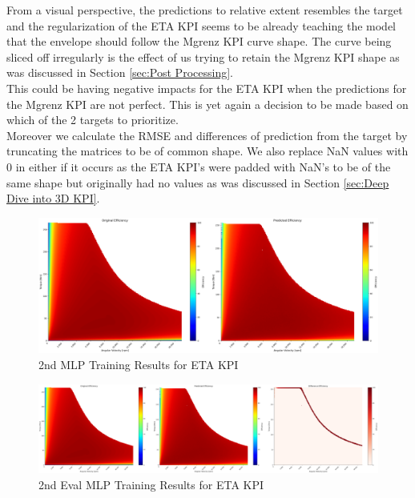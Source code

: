 \documentclass{report} %
\begin{document}
From a visual perspective, the predictions to relative extent resembles the target and the regularization of the ETA \ac{KPI} seems to be already teaching the model that the envelope should follow the Mgrenz \ac{KPI} curve shape.  
The curve being sliced off irregularly is the effect of us trying to retain the Mgrenz \ac{KPI} shape as was discussed in Section \ref{sec:Post Processing}.\\
This could be having negative impacts for the ETA \ac{KPI}  when the predictions for the Mgrenz \ac{KPI} are not perfect.
This is yet again a decision to be made based on which of the 2 targets to prioritize. \\

Moreover we calculate the RMSE and differences of prediction from the target by truncating the matrices to be of common shape.
We also replace \ac{NaN} values with 0 in either if it occurs as the ETA \ac{KPI}'s were padded with \ac{NaN}'s to be of the same shape but originally had no values as was discussed in Section \ref{sec:Deep Dive into 3D KPI}.\\

\begin{figure}[H]
    \centering
    \includegraphics[width=1\textwidth]{./ReportImages/KPI3Dprediction2.png} 
    \caption{2nd MLP Training Results for ETA \ac{KPI}} 
    \label{fig:2nd MLP Training Results for 3D KPI(ETA)}
\end{figure}


\begin{figure}[H]
    \centering
    \includegraphics[width=1\textwidth]{./ReportImages/evalKPI3Dprediction2.png} 
    \caption{2nd Eval MLP Training Results for ETA \ac{KPI}} 
    \label{fig:2nd Eval MLP Training for 3D KPI(ETA)}
\end{figure}
\end{document}
